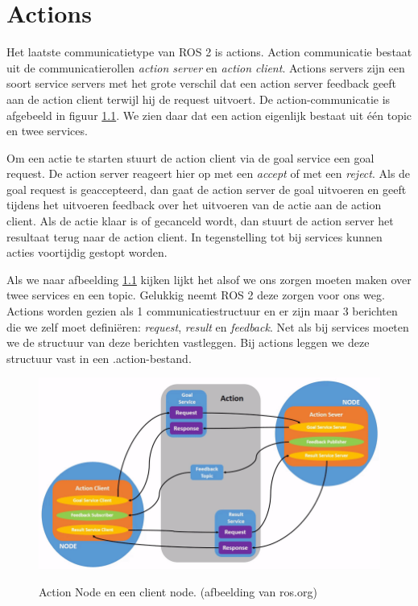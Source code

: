 \chapter{Actions}
\label{chp:actions}
Het laatste communicatietype van ROS 2 is actions. Action communicatie bestaat uit de communicatierollen \textit{action server} en \textit{action client}. Actions servers zijn een soort service servers met het grote verschil dat een action server feedback geeft aan de action client terwijl hij de request uitvoert. De action-communicatie is afgebeeld in figuur \ref{fig:action_node}. We zien daar dat een action eigenlijk bestaat uit \'e\'en topic en twee services.

Om een actie te starten stuurt de action client via de goal service een goal request. De action server reageert hier op met een \textit{accept} of met een \textit{reject}. Als de goal request is geaccepteerd, dan gaat de action server de goal uitvoeren en geeft tijdens het uitvoeren feedback over het uitvoeren van de actie aan de action client. Als de actie klaar is of gecanceld wordt, dan stuurt de action server het resultaat terug naar de action client. In tegenstelling tot bij services kunnen acties voortijdig gestopt worden. 

Als we naar afbeelding \ref{fig:action_node} kijken lijkt het alsof we ons zorgen moeten maken over twee services en een topic. Gelukkig neemt ROS 2 deze zorgen voor ons weg. Actions worden gezien als 1 communicatiestructuur en er zijn maar 3 berichten die we zelf moet definiëren: \textit{request}, \textit{result} en \textit{feedback}. Net als bij services moeten we de structuur van deze berichten vastleggen.  Bij actions leggen we deze structuur vast in een .action-bestand.

\begin{figure}[ht]
\begin{center}
\includegraphics[scale=0.7]{Pictures/Action-SingleActionClient.png}\\
\end{center}
\caption{Action Node en een client node. {\tiny (afbeelding van ros.org)}}\label{fig:action_node}
\end{figure}


